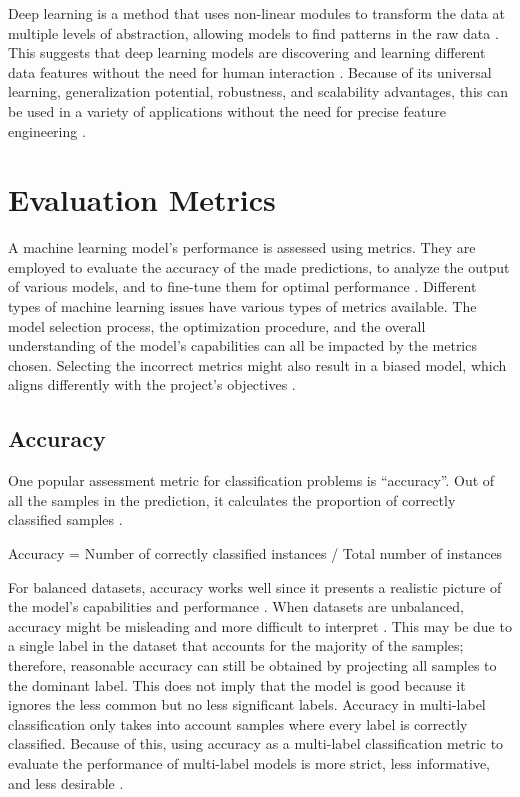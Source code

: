 Deep learning is a method that uses non-linear modules to transform the data at multiple levels of abstraction, allowing models to find patterns in the raw data \citep{helland_tackling_2023}. This suggests that deep learning models are discovering and learning different data features without the need for human interaction \citep{helland_tackling_2023}. Because of its universal learning, generalization potential, robustness, and scalability advantages, this can be used in a variety of applications without the need for precise feature engineering \citep{helland_tackling_2023}.

\section{Evaluation Metrics}

A machine learning model's performance is assessed using metrics. They are employed to evaluate the accuracy of the made predictions, to analyze the output of various models, and to fine-tune them for optimal performance \citep{helland_tackling_2023}. Different types of machine learning issues have various types of metrics available. The model selection process, the optimization procedure, and the overall understanding of the model's capabilities can all be impacted by the metrics chosen. Selecting the incorrect metrics might also result in a biased model, which aligns differently with the project's objectives \citep{helland_tackling_2023}.

\subsection{Accuracy}

One popular assessment metric for classification problems is “accuracy”. Out of all the samples in the prediction, it calculates the proportion of correctly classified samples \citep{helland_tackling_2023}. 

Accuracy = Number of correctly classified instances / Total number of instances

For balanced datasets, accuracy works well since it presents a realistic picture of the model's capabilities and performance \citep{helland_tackling_2023}. When datasets are unbalanced, accuracy might be misleading and more difficult to interpret \citep{helland_tackling_2023}. This may be due to a single label in the dataset that accounts for the majority of the samples; therefore, reasonable accuracy can still be obtained by projecting all samples to the dominant label. This does not imply that the model is good because it ignores the less common but no less significant labels. Accuracy in multi-label classification only takes into account samples where every label is correctly classified. Because of this, using accuracy as a multi-label classification metric to evaluate the performance of multi-label models is more strict, less informative, and less desirable \citep{helland_tackling_2023}.